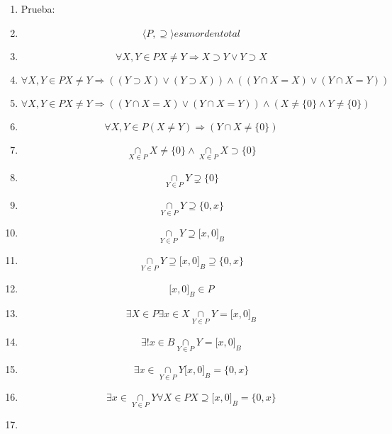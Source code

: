 \begin{enumerate}
\begin{enumerate}
\begin{enumerate}
      \begin{enumerate}
      \def\labelenumiv{\arabic{enumiv}.}
      \tightlist
      \item
        Prueba:
      \item
        \[{\langle{P, \supseteq}\rangle}\mathit{es}\mathit{un}\mathit{orden}\mathit{total}\]
      \item
        \[\forall X,{Y \in P}{X \neq Y}\Rightarrow{{X \supset {Y \vee Y}} \supset X}\]
      \item
        \[\forall X,{Y \in P}{X \neq Y}\Rightarrow{\left( {\left( {Y \supset X} \right) \vee \left( {Y \supset X} \right)} \right) \land \left( {\left( {{Y \cap X} = X} \right) \vee \left( {{Y \cap X} = Y} \right)} \right)}\]
      \item
        \[\forall X,{Y \in P}{X \neq Y}\Rightarrow{\left( {\left( {{Y \cap X} = X} \right) \vee \left( {{Y \cap X} = Y} \right)} \right) \land \left( {{X \neq {{\{ 0\}} \land Y}} \neq {\{ 0\}}} \right)}\]
      \item
        \[\forall X,{Y \in P}\left( {X \neq Y} \right)\Rightarrow\left( {{Y \cap X} \neq {\{ 0\}}} \right)\]
      \item
        \[\underset{X \in P}{\cap}{X \neq {{\{ 0\}} \land \underset{X \in P}{\cap}}}{X \supset {\{ 0\}}}\]
      \item
        \[\underset{Y \in P}{\cap}Y \supsetneq {\{ 0\}}\]
      \item
        \[\underset{Y \in P}{\cap}{Y \supseteq {\{{0,x}\}}}\]
      \item
        \[\underset{Y \in P}{\cap}{Y \supseteq {\lbrack{x,0}\rbrack}_{B}}\]
      \item
        \[\underset{Y \in P}{\cap}{{Y \supseteq {\lbrack{x,0}\rbrack}_{B}} \supseteq {\{{0,x}\}}}\]
      \item
        \[{\lbrack{x,0}\rbrack}_{B} \in P\]
      \item
        \[\exists{X \in P}\exists{x \in X}{\underset{Y \in P}{\cap}{Y = {\lbrack{x,0}\rbrack}_{B}}}\]
      \item
        \[\exists!{x \in B}{\underset{Y \in P}{\cap}{Y = {\lbrack{x,0}\rbrack}_{B}}}\]
      \item
        \[\exists{x \in {\underset{Y \in P}{\cap}Y{{\lbrack{x,0}\rbrack}_{B} = {\{{0,x}\}}}}}\]
      \item
        \[\exists{x \in {\underset{Y \in P}{\cap}Y\forall{X \in P}{{X \supseteq {\lbrack{x,0}\rbrack}_{B}} = {\{{0,x}\}}}}}\]
      \item

\end{enumerate}
\end{enumerate}
\end{enumerate}
\end{enumerate}
